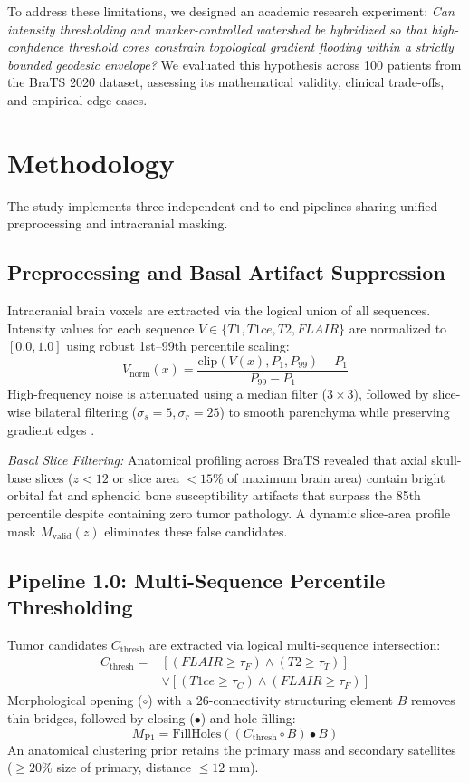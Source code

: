 \documentclass[10pt,conference]{IEEEtran}
\begin{document}
To address these limitations, we designed an academic research experiment: \textit{Can intensity thresholding and marker-controlled watershed be hybridized so that high-confidence threshold cores constrain topological gradient flooding within a strictly bounded geodesic envelope?} We evaluated this hypothesis across 100 patients from the BraTS 2020 dataset, assessing its mathematical validity, clinical trade-offs, and empirical edge cases.

\section{Methodology}
The study implements three independent end-to-end pipelines sharing unified preprocessing and intracranial masking.

\subsection{Preprocessing and Basal Artifact Suppression}
Intracranial brain voxels are extracted via the logical union of all sequences. Intensity values for each sequence $V \in \{T1, T1ce, T2, FLAIR\}$ are normalized to $[0.0, 1.0]$ using robust 1st--99th percentile scaling:
\begin{equation}
V_{\text{norm}}(x) = \frac{\text{clip}(V(x), P_1, P_{99}) - P_1}{P_{99} - P_1}
\end{equation}
High-frequency noise is attenuated using a median filter ($3\times3$), followed by slice-wise bilateral filtering ($\sigma_s=5, \sigma_r=25$) to smooth parenchyma while preserving gradient edges \cite{tomasi1998bilateral}.

\textit{Basal Slice Filtering:} Anatomical profiling across BraTS revealed that axial skull-base slices ($z < 12$ or slice area $< 15\%$ of maximum brain area) contain bright orbital fat and sphenoid bone susceptibility artifacts that surpass the 85th percentile despite containing zero tumor pathology. A dynamic slice-area profile mask $M_{\text{valid}}(z)$ eliminates these false candidates.

\subsection{Pipeline 1.0: Multi-Sequence Percentile Thresholding}
Tumor candidates $C_{\text{thresh}}$ are extracted via logical multi-sequence intersection:
\begin{align}
C_{\text{thresh}} = &\left[ (FLAIR \ge \tau_F) \land (T2 \ge \tau_T) \right] \nonumber \\
&\lor \left[ (T1ce \ge \tau_C) \land (FLAIR \ge \tau_F) \right]
\end{align}
Morphological opening ($\circ$) with a 26-connectivity structuring element $B$ removes thin bridges, followed by closing ($\bullet$) and hole-filling:
\begin{equation}
M_{\text{P1}} = \text{FillHoles}\left( (C_{\text{thresh}} \circ B) \bullet B \right)
\end{equation}
An anatomical clustering prior retains the primary mass and secondary satellites ($\ge 20\%$ size of primary, distance $\le 12\text{ mm}$).
\end{document}
